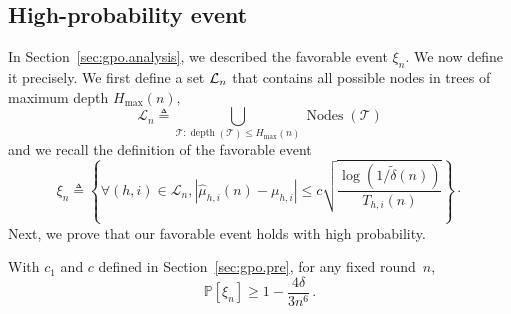 \subsection{High-probability event}\label{proof:lemma_event}

In Section~\ref{sec:gpo.analysis}, we described the favorable event $\xi_n$.  We now define it precisely. We first define a set $\mathcal{L}_n$ that contains all possible nodes in trees of maximum depth $H_{\max}(n),$
\[
\mathcal{L}_n \triangleq \bigcup\limits_{\mathcal{T}:\operatorname{depth}(\mathcal{T})\leq H_{\max}(n)} \operatorname{Nodes}(\mathcal{T})
\]
and we recall the definition of the favorable event
\[
\xi_n \triangleq \left\{ \forall (h,i)\in\mathcal{L}_n,  |\hat{\mu}_{h,i}(n) - \mu_{h,i}| \leq c\sqrt{\frac{\log(1/\tilde{\delta}(n))}{T_{h,i}(n)}} \right\}\!\cdot\]
Next, we prove that our favorable event holds with high probability.

\begin{lemma}\label{lemma:gpo.event}
\begin{leftbar}[lemmabar]
With $c_1$ and $c$ defined in Section~\ref{sec:gpo.pre}, for any fixed round~$n$,
\[
    \mathbb{P}\left[ \xi_n \right] \geq 1-\frac{4\delta}{3n^6}\,.
\]
\end{leftbar}
\end{lemma}

